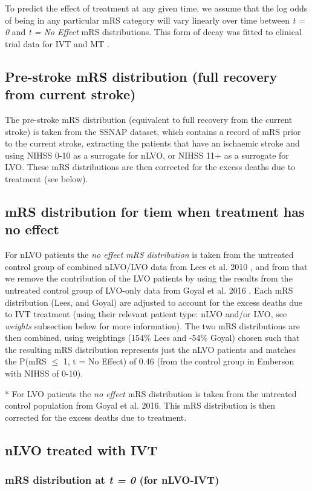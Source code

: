 To predict the effect of treatment at any given time, we assume that the log odds of being in any particular mRS category will vary linearly over time between \emph{t = 0} and \emph{t = No Effect} mRS distributions. This form of decay was fitted to clinical trial data for IVT \cite{emberson_effect_2014} and MT \cite{fransen_time_2016}.

\subsection{Pre-stroke mRS distribution (full recovery from current stroke)}

The pre-stroke mRS distribution (equivalent to full recovery from the current stroke) is taken from the SSNAP dataset, which contains a record of mRS prior to the current stroke, extracting the patients that have an ischaemic stroke and using NIHSS 0-10 as a surrogate for nLVO, or NIHSS 11+ as a surrogate for LVO. These mRS distributions are then corrected for the excess deaths due to treatment (see below).

\subsection{mRS distribution for tiem when treatment has no effect}

For nLVO patients the \emph{no effect mRS distribution} is taken from the untreated control group of combined nLVO/LVO data from Lees et al. 2010 \cite{lees_time_2010}, and from that we remove the contribution of the LVO patients by using the results from the untreated control group of LVO-only data from Goyal et al. 2016 . Each mRS distribution (Lees, and Goyal) are adjusted to account for the excess deaths due to IVT treatment (using their relevant patient type: nLVO and/or LVO, see \emph{weights} subsection below for more information). The two mRS distributions are then combined, using weightings (154\% Lees and -54\% Goyal) chosen such that the resulting mRS distribution represents just the nLVO patients and matches the P(mRS $\leq$ 1, t = No Effect) of 0.46 (from the control group in Emberson with NIHSS of 0-10).

* For LVO patients the \emph{no effect} mRS distribution is taken from the untreated control population from Goyal et al. 2016.  This mRS distribution is then corrected for the excess deaths due to treatment.



\subsection{nLVO treated with IVT}

\subsubsection{mRS distribution at \emph{t = 0} (for nLVO-IVT)}

